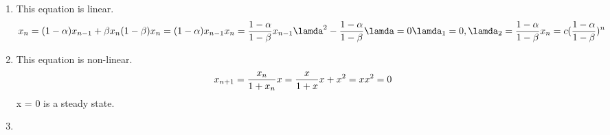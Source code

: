 \begin{homeworkProblem}[1]
\begin{enumerate}
  \item This equation is linear.
  \[
      x_n = (1-\alpha) x_{n-1} + \beta x_n \\
      (1 - \beta) x_n = (1 - \alpha) x_{n-1} \\
      x_n = \frac{1 - \alpha}{1 - \beta} x_{n-1} \\
      \lamda^2 - \frac{1 - \alpha}{1 - \beta} \lamda = 0 \\
      \lamda_1 = 0, \lamda_2 = \frac{1 - \alpha}{1 - \beta} \\
      x_n = c(\frac{1 - \alpha}{1 - \beta})^n \\
      \]
      
  \item This equation is non-linear.
  \[
     x_{n+1} = \frac{x_n}{1 + x_n} \\
     x = \frac{x}{1 + x}  \\
     x + x^2 = x \\
     x^2 = 0 \\
  \]
  x = 0 is a steady state.
  
  \item
\end{enumerate}
\end{homeworkProblem}
